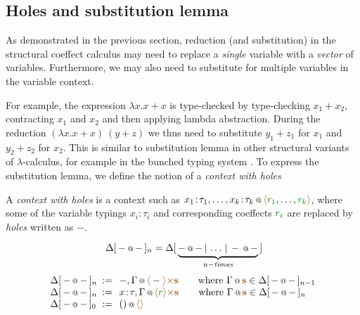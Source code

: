 \subsection{Holes and substitution lemma}

As demonstrated in the previous section, reduction (and substitution) in the structural coeffect 
calculus may need to replace a \emph{single} variable with a \emph{vector} of variables. 
Furthermore, we may also need to substitute for multiple variables in the variable context.

For example, the expression $\lambda x.x+x$ is type-checked by type-checking $x_1 + x_2$,
contracting $x_1$ and $x_2$ and then applying lambda abstraction. During the reduction 
$(\lambda x.x+x)~(y+z)$ we thus need to substitute $y_1+z_1$ for $x_1$ and $y_2+z_2$ for $x_2$.
This is similar to substitution lemma in other structural variants of $\lambda$-calculus,
for example in the bunched typing system \cite{substruct-bunched}.
To express the substitution lemma, we define the notion of a \emph{context with holes}

\begin{definition}
A \emph{context with holes} is a context such as $\coctx{x_1\!:\!\tau_1, \ldots, x_k\!:\!\tau_k}{\alift{\cclrd{r_1}, \ldots, \cclrd{r_k}}}$,
where some of the variable typings $x_i\!:\!\tau_i$ and corresponding coeffects $\cclrd{r_i}$ 
are replaced by \emph{holes} written as $-$.

\begin{equation*}
~\Delta[\,\coctx{-}{-}\,]_n = \Delta[\,\underbrace{\coctx{-}{-} \,|\, \ldots \,|\, \coctx{-}{-}}_{ n-\textit{times} } \,]
\end{equation*}
\begin{equation*}
\begin{array}{lcl}
 \Delta[\,\coctx{-}{-}\,]_n &\narrow{:=}&
   \coctx{-, \Gamma}{\alift{-} \atimes \aclrd{\textbf{s}} }
   \qquad \textnormal{where}~\coctx{\Gamma}{\aclrd{\textbf{s}}} \in \Delta[\,\coctx{-}{-}\,]_{n-1} \\
 \Delta[\,\coctx{-}{-}\,]_n &\narrow{:=}&
   \coctx{x\!:\!\tau, \Gamma}{\alift{\cclrd{r}} \atimes \aclrd{\textbf{s}} }
   \qquad \textnormal{where}~\coctx{\Gamma}{\aclrd{\textbf{s}}} \in \Delta[\,\coctx{-}{-}\,]_n \\
 \Delta[\,\coctx{-}{-}\,]_0 &\narrow{:=}&
   \coctx{()}{\alift{}}
\end{array} 
\end{equation*} 
\end{definition}

